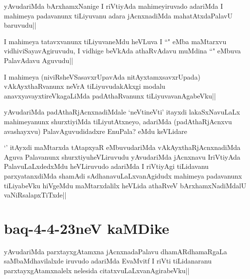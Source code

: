 
\begin{artha}
yAvudariMda bArxhamxNanige I riVtiyAda mahimeyiruvado adariMda I mahimeya padavanunx tiLiyuvanu adara jAcnxnadiMda mahatAtxdaPalavU baruvudu||
\end{artha}


\begin{artha}
I mahimeya tatavxvanunx tiLiyuvaneMdu heVLuva I ``\stext" eMba maMtarxvu vidhiviSayavAgiruvudu, I vidhige beVkAda athaRvAdavu muMdina ``\stext" eMbuva PalavAdavu Aguvudu||
\end{artha}

\begin{artha}
I mahimeya (niviRsheVSasavxrUpavAda nitAyxtamxsavxrUpada) vAkAyxthaRvanunx neVrA tiLiyuvudakAkxgi modalu anavxyavayxtireVkagaLiMda padAthaRvanunx tiLiyuvavanAgabeVku||
\end{artha}


\begin{artha}
yAvudariMda padAthaRjAcnxnadiMdale `neVtineVti' itayxdi lakaSxNavuLaLx mahimeyanunx shurxtiyiMda tiLiyutAtxneyo, adariMda (padAthaRjAcnxvu avashayxvu) PalavAguvudidadxre EnuPala? eMdu keVLidare
\end{artha}

\begin{artha}
`\stext' itAyxdi maMtarxda tAtapxyaR eMbuvudariMda vAkAyxthaRjAcnxnadiMda Aguva Palavanunx shurxtiyuheVLiruvudu yAvudariMda jAcnxnavu IriVtiyAda PalavuLaLxdedxMdu heVLiruvudo adariMda I riVtiyAgi tiLidavanu parxyatanxdiMda shamAdi sAdhanavuLaLxvanAgidudx mahimeya padavanunx tiLiyabeVku hiVgeMdu maMtarxdalilx heVLida athaRveV bArxhamxNadiMdalU vaNiRsalapxTiTxde||
\end{artha}

\section*{baq-4-4-23neV kaMDike}

\begin{artha}
yAvudariMda parxtayxgAtamxna jAcnxnadaPalavu dhamARdhamaRgaLa saMbaMdhavilalxde iruvudo adariMda EvaMvitf I riVti tiLidanaranu parxtayxgAtamxnalelx nelesida citatxvuLaLxvanAgirabeVku||
\end{artha}

